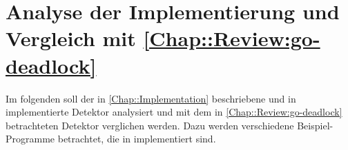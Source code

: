 \chapter{Analyse der Implementierung und Vergleich mit 
    \ref{Chap::Review:go-deadlock}}
Im folgenden soll der in \ref{Chap::Implementation} beschriebene und in 
\cite{implementation} implementierte Detektor analysiert und mit dem in 
\ref{Chap::Review:go-deadlock} betrachteten Detektor verglichen
werden. Dazu werden verschiedene Beispiel-Programme betrachtet, die in 
\cite{examples} implementiert sind.
